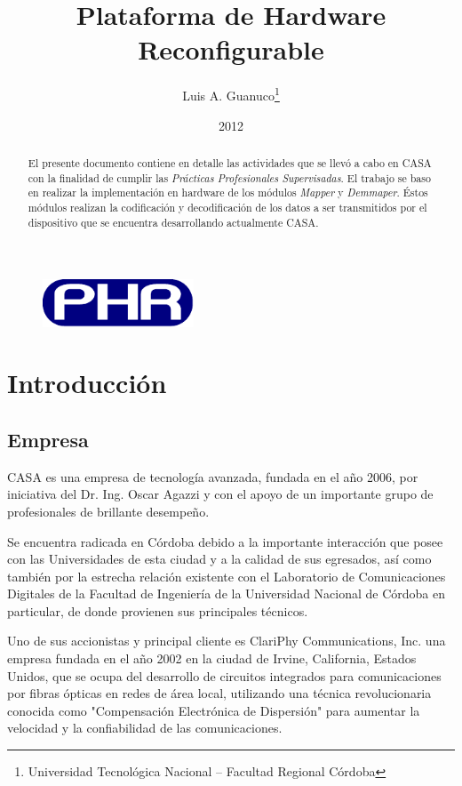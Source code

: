 \documentclass[a4paper]{article}
\author{Luis A. Guanuco\thanks{Universidad Tecnológica Nacional -- Facultad Regional Córdoba}}
\title{Plataforma de Hardware Reconfigurable}
\date{2012}
\begin{document}
\maketitle
\begin{figure}[h]
  \centering
  \includegraphics[width=0.4\textwidth]{images/logov2_ES}
\end{figure}

\begin{abstract}
  

  El presente documento contiene en detalle las actividades que se llevó a cabo en \ac{CASA} con la finalidad de cumplir las \emph{Prácticas Profesionales Supervisadas}. El trabajo se baso en realizar la implementación en hardware de los módulos \emph{Mapper} y \emph{Demmaper}. Éstos módulos realizan la codificación y decodificación de los datos a ser transmitidos por el dispositivo que se encuentra desarrollando actualmente \ac{CASA}.
\end{abstract}

\section{Introducción}
\label{sec:intro}

\subsection{Empresa}
\label{sec:empresa}
\ac{CASA} es una empresa de tecnología avanzada, fundada en el año 2006, por iniciativa del Dr. Ing. Oscar Agazzi y con el apoyo de un importante grupo de profesionales de brillante desempeño.

Se encuentra radicada en Córdoba debido a la importante interacción que posee con las Universidades de esta ciudad y a la calidad de sus egresados, así como también por la estrecha relación existente con el Laboratorio de Comunicaciones Digitales de la Facultad de Ingeniería de la Universidad Nacional de Córdoba en particular, de donde provienen sus principales técnicos.

Uno de sus accionistas y principal cliente es ClariPhy Communications, Inc. una empresa fundada en el año 2002 en la ciudad de Irvine, California, Estados Unidos, que se ocupa del desarrollo de circuitos integrados para comunicaciones por fibras ópticas en redes de área local, utilizando una técnica revolucionaria conocida como "Compensación Electrónica de Dispersión" para aumentar la velocidad y la confiabilidad de las comunicaciones.
\end{document}
